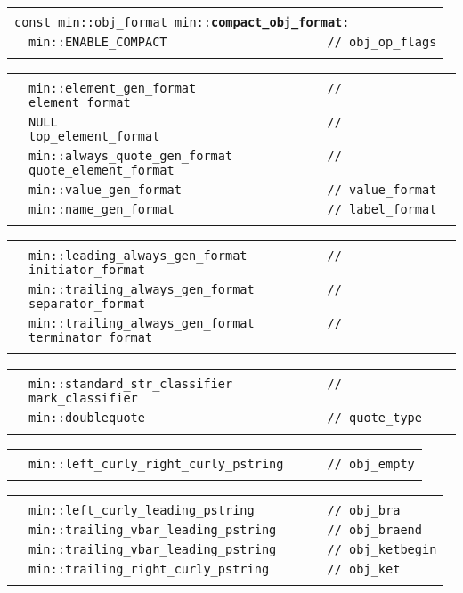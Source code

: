 \documentclass[12pt]{article}
\makeatletter
\newcommand{\TT}[1]{{\tt \bfseries #1}}
\newcommand{\ttindex}[1]{\index{#1@{\tt #1}}}
\newenvironment{indpar}[1][0.3in]%
	{\begin{list}{}%
		     {\setlength{\itemsep}{0in}%
		      \setlength{\topsep}{0in}%
		      \setlength{\parsep}{1ex}%
		      \setlength{\labelwidth}{#1}%
		      \setlength{\leftmargin}{#1}%
		      \addtolength{\leftmargin}{\labelsep}}%
	 \item}%
	{\end{list}}
\newcommand{\LABEL}[1]{\label{#1}}
\newlength{\ARGBREAKLENGTH}
\newcommand{\ARGBREAK}[1][\ARGBREAKLENGTH]{\\&\hspace*{#1}}
\newcommand{\MINKEY}[1]%
	   {\TT{#1}\ttindex{min::#1}\ttindex{#1}}
\makeatother
\begin{document}
\begin{indpar}[1em]

\begin{tabular}{r@{}l}\hspace*{0.1in} \\[-3ex]
\multicolumn{2}{l}{\tt const min::obj\_format
                   min::\MINKEY{compact\_obj\_format}:}%
\LABEL{MIN::COMPACT_OBJ_FORMAT}\ARGBREAK
\verb|min::ENABLE_COMPACT                      // obj_op_flags|\ARGBREAK
\end{tabular}

\vspace{-4ex}\begin{tabular}{r@{}l}\hspace*{0.1in}\ARGBREAK
\verb|min::element_gen_format                  // element_format|\ARGBREAK
\verb|NULL                                     // top_element_format|\ARGBREAK
\verb|min::always_quote_gen_format             // quote_element_format|\ARGBREAK
\verb|min::value_gen_format                    // value_format|\ARGBREAK
\verb|min::name_gen_format                     // label_format|\ARGBREAK
\end{tabular}

\vspace{-4ex}\begin{tabular}{r@{}l}\hspace*{0.1in}\ARGBREAK
\verb|min::leading_always_gen_format           // initiator_format|\ARGBREAK
\verb|min::trailing_always_gen_format          // separator_format|\ARGBREAK
\verb|min::trailing_always_gen_format          // terminator_format|\ARGBREAK
\end{tabular}

\vspace{-4ex}\begin{tabular}{r@{}l}\hspace*{0.1in}\ARGBREAK
\verb|min::standard_str_classifier             // mark_classifier|\ARGBREAK
\verb|min::doublequote                         // quote_type|\ARGBREAK
\end{tabular}

\vspace{-4ex}\begin{tabular}{r@{}l}\hspace*{0.1in}\ARGBREAK
\verb|min::left_curly_right_curly_pstring      // obj_empty|\ARGBREAK
\end{tabular}

\vspace{-4ex}\begin{tabular}{r@{}l}\hspace*{0.1in}\ARGBREAK
\verb|min::left_curly_leading_pstring          // obj_bra|\ARGBREAK
\verb|min::trailing_vbar_leading_pstring       // obj_braend|\ARGBREAK
\verb|min::trailing_vbar_leading_pstring       // obj_ketbegin|\ARGBREAK
\verb|min::trailing_right_curly_pstring        // obj_ket|\ARGBREAK
\end{tabular}


\end{indpar}
\end{document}
